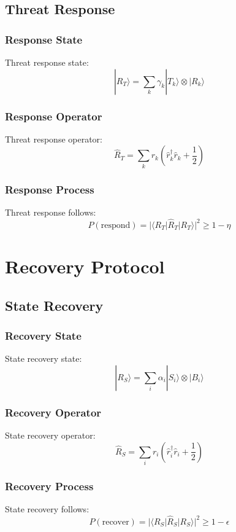 \documentclass[12pt]{article}
\begin{document}
\subsection{Threat Response}
\subsubsection{Response State}
Threat response state:
\begin{equation}
|R_T\rangle = \sum_k \gamma_k|T_k\rangle \otimes |R_k\rangle
\end{equation}
\subsubsection{Response Operator}
Threat response operator:
\begin{equation}
\hat{R}_T = \sum_k r_k(\hat{r}_k^\dagger\hat{r}_k + \frac{1}{2})
\end{equation}
\subsubsection{Response Process}
Threat response follows:
\begin{equation}
P(\text{respond}) = |\langle R_T|\hat{R}_T|R_T\rangle|^2 \geq 1 - \eta
\end{equation}
\section{Recovery Protocol}
\subsection{State Recovery}
\subsubsection{Recovery State}
State recovery state:
\begin{equation}
|R_S\rangle = \sum_i \alpha_i|S_i\rangle \otimes |B_i\rangle
\end{equation}
\subsubsection{Recovery Operator}
State recovery operator:
\begin{equation}
\hat{R}_S = \sum_i r_i(\hat{r}_i^\dagger\hat{r}_i + \frac{1}{2})
\end{equation}
\subsubsection{Recovery Process}
State recovery follows:
\begin{equation}
P(\text{recover}) = |\langle R_S|\hat{R}_S|R_S\rangle|^2 \geq 1 - \epsilon
\end{equation}
\end{document}
